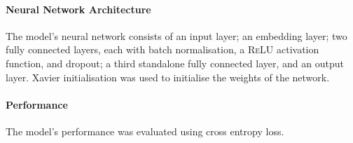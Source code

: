 \documentclass[12pt,a4paper]{article}
\begin{document}
\paragraph{Neural Network Architecture} The model's neural network consists of an input layer; an embedding layer; two fully connected layers, each with batch normalisation, a \textsc{ReLU} activation function, and dropout; a third standalone fully connected layer, and an output layer. Xavier initialisation was used to initialise the weights of the network.

\paragraph{Performance} The model's performance was evaluated using cross entropy loss.

\printbibliography
\end{document}
